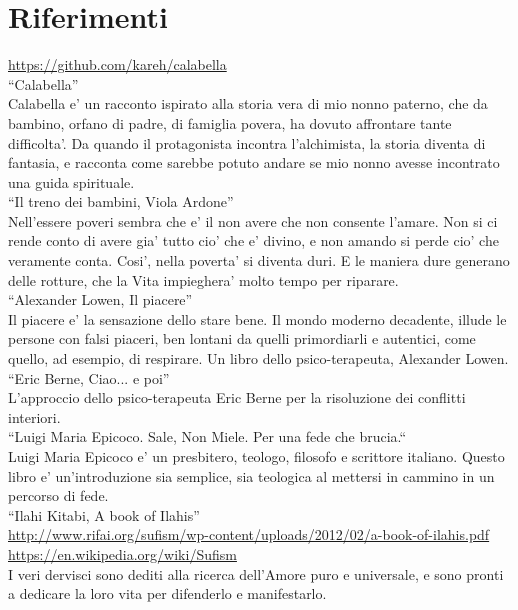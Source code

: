 \chapter{Riferimenti}
\label{chapRiferimenti}

  \url{https://github.com/kareh/calabella}\\
  ``Calabella''\\
  Calabella e' un racconto ispirato alla storia vera di mio nonno paterno, che da bambino, orfano di padre, di famiglia povera, ha dovuto affrontare tante difficolta'. Da quando il protagonista incontra l'alchimista, la storia diventa di fantasia, e racconta come sarebbe potuto andare se mio nonno avesse incontrato una guida spirituale.\\

  ``Il treno dei bambini, Viola Ardone''\\
  Nell'essere poveri sembra che e' il non avere che non consente l'amare. Non si ci rende conto di avere gia' tutto cio' che e' divino, e non amando si perde cio' che veramente conta. Cosi', nella poverta' si diventa duri. E le maniera dure generano delle rotture, che la Vita impieghera' molto tempo per riparare. \\

  ``Alexander Lowen, Il piacere''\\
  Il piacere e' la sensazione dello stare bene. Il mondo moderno decadente, illude le persone
  con falsi piaceri, ben lontani da quelli primordiarli e autentici, come quello, ad esempio,
  di respirare. Un libro dello psico-terapeuta, Alexander Lowen.\\
  
  ``Eric Berne, Ciao... e poi''\\
  L'approccio dello psico-terapeuta Eric Berne per la risoluzione dei conflitti interiori.\\
  
  ``Luigi Maria Epicoco. Sale, Non Miele. Per una fede che brucia.``\\
  Luigi Maria Epicoco e' un presbitero, teologo, filosofo e scrittore italiano. Questo libro e' un'introduzione sia semplice, sia teologica al mettersi in cammino in un percorso di fede.\\

  ``Ilahi Kitabi, A book of Ilahis''\\
  \url{http://www.rifai.org/sufism/wp-content/uploads/2012/02/a-book-of-ilahis.pdf}\\
  \url{https://en.wikipedia.org/wiki/Sufism}\\
  I veri dervisci sono dediti alla ricerca dell'Amore puro e universale, e sono pronti a
  dedicare la loro vita per difenderlo e manifestarlo.\\

